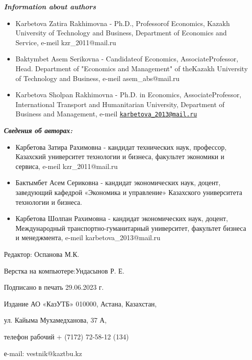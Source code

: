 \begin{center}
\emph{{\bfseries Information about authors}}
\end{center}

\begin{itemize}
\item
Karbetova Zatira Rakhimovna - Ph.D., Professorof Economics, Kazakh
University of Technology and Business, Department of Economics and
Service, e-meil kzr\_2011@mail.ru

\item
Baktymbet Asem Serikovna - Candidateof Economics, AssociateProfessor,
Head. Department of "Economics and Management" of theKazakh University
of Technology and Business, e-meil asem\_abs@mail.ru

\item
Karbetova Sholpan Rakhimovna - Ph.D. in Economics, AssociateProfessor,
International Transport and Humanitarian University, Department of
Business and Management, e-meil
\href{mailto:karbetova_2013@mail.ru}{\nolinkurl{karbetova\_2013@mail.ru}}
\end{itemize}

\begin{center}
\emph{{\bfseries Сведения об авторах:}}
\end{center}

\begin{itemize}
\item
Карбетова Затира Рахимовна - кандидат технических наук, профессор,
Казахский университет технологии и бизнеса, факультет экономики и
сервиса, e-meil kzr\_2011@mail.ru

\item
Бактымбет Асем Сериковна - кандидат экономических наук, доцент,
заведующий кафедрой «Экономика и управление» Казахского университета
технологии и бизнеса.

\item
Карбетова Шолпан Рахимовна - кандидат экономических наук, доцент,
Международный транспортно-гуманитарный университет, факультет бизнеса и
менеджмента, e-meil karbetova\_2013@mail.ru
\end{itemize}

\newpage

\begin{center}
Редактор: Оспанова М.К.

Верстка на компьютере:Ундасынов Р. Е.

Подписано в печать 29.06.2023 г.

Издание АО «КазУТБ» 010000, Астана, Казахстан,

ул. Кайыма Мухамедханова, 37 А,

телефон рабочий + (7172) 72-58-12 (134)

е-mail: vestnik@kaztbu.kz
\end{center}
